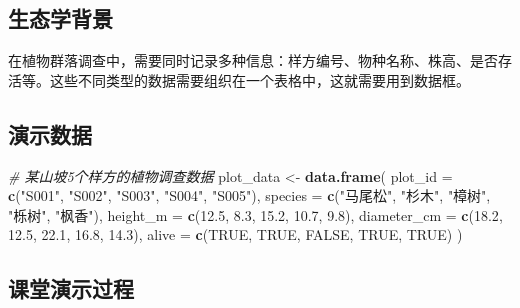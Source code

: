 \documentclass[
]{book}
\newenvironment{Shaded}{\begin{snugshade}}{\end{snugshade}}
\newcommand{\AttributeTok}[1]{\textcolor[rgb]{0.13,0.29,0.53}{#1}}
\newcommand{\CommentTok}[1]{\textcolor[rgb]{0.56,0.35,0.01}{\textit{#1}}}
\newcommand{\ConstantTok}[1]{\textcolor[rgb]{0.56,0.35,0.01}{#1}}
\newcommand{\FloatTok}[1]{\textcolor[rgb]{0.00,0.00,0.81}{#1}}
\newcommand{\FunctionTok}[1]{\textcolor[rgb]{0.13,0.29,0.53}{\textbf{#1}}}
\newcommand{\NormalTok}[1]{#1}
\newcommand{\OtherTok}[1]{\textcolor[rgb]{0.56,0.35,0.01}{#1}}
\newcommand{\StringTok}[1]{\textcolor[rgb]{0.31,0.60,0.02}{#1}}
\begin{document}
\hypertarget{ux751fux6001ux5b66ux80ccux666f-2}{%
\subsection{生态学背景}\label{ux751fux6001ux5b66ux80ccux666f-2}}

在植物群落调查中，需要同时记录多种信息：样方编号、物种名称、株高、是否存活等。这些不同类型的数据需要组织在一个表格中，这就需要用到数据框。

\hypertarget{ux6f14ux793aux6570ux636e-2}{%
\subsection{演示数据}\label{ux6f14ux793aux6570ux636e-2}}

\begin{Shaded}
\begin{Highlighting}[]
\CommentTok{\# 某山坡5个样方的植物调查数据}
\NormalTok{plot\_data }\OtherTok{\textless{}{-}} \FunctionTok{data.frame}\NormalTok{(}
  \AttributeTok{plot\_id =} \FunctionTok{c}\NormalTok{(}\StringTok{"S001"}\NormalTok{, }\StringTok{"S002"}\NormalTok{, }\StringTok{"S003"}\NormalTok{, }\StringTok{"S004"}\NormalTok{, }\StringTok{"S005"}\NormalTok{),}
  \AttributeTok{species =} \FunctionTok{c}\NormalTok{(}\StringTok{"马尾松"}\NormalTok{, }\StringTok{"杉木"}\NormalTok{, }\StringTok{"樟树"}\NormalTok{, }\StringTok{"栎树"}\NormalTok{, }\StringTok{"枫香"}\NormalTok{),}
  \AttributeTok{height\_m =} \FunctionTok{c}\NormalTok{(}\FloatTok{12.5}\NormalTok{, }\FloatTok{8.3}\NormalTok{, }\FloatTok{15.2}\NormalTok{, }\FloatTok{10.7}\NormalTok{, }\FloatTok{9.8}\NormalTok{),}
  \AttributeTok{diameter\_cm =} \FunctionTok{c}\NormalTok{(}\FloatTok{18.2}\NormalTok{, }\FloatTok{12.5}\NormalTok{, }\FloatTok{22.1}\NormalTok{, }\FloatTok{16.8}\NormalTok{, }\FloatTok{14.3}\NormalTok{),}
  \AttributeTok{alive =} \FunctionTok{c}\NormalTok{(}\ConstantTok{TRUE}\NormalTok{, }\ConstantTok{TRUE}\NormalTok{, }\ConstantTok{FALSE}\NormalTok{, }\ConstantTok{TRUE}\NormalTok{, }\ConstantTok{TRUE}\NormalTok{)}
\NormalTok{)}
\end{Highlighting}
\end{Shaded}

\hypertarget{ux8bfeux5802ux6f14ux793aux8fc7ux7a0b-2}{%
\subsection{课堂演示过程}\label{ux8bfeux5802ux6f14ux793aux8fc7ux7a0b-2}}
\end{document}
